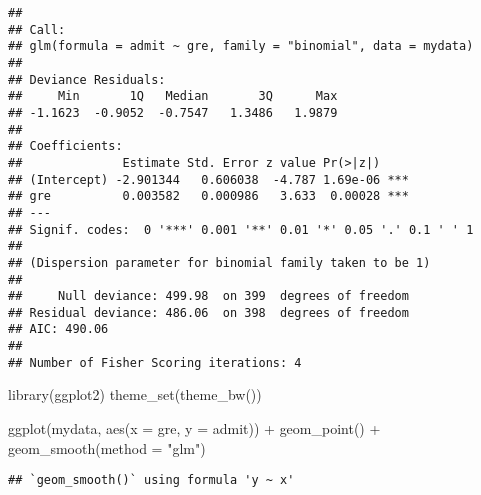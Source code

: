 \documentclass[
]{book}
\newenvironment{Shaded}{\begin{snugshade}}{\end{snugshade}}
\newcommand{\AttributeTok}[1]{\textcolor[rgb]{0.77,0.63,0.00}{#1}}
\newcommand{\FunctionTok}[1]{\textcolor[rgb]{0.00,0.00,0.00}{#1}}
\newcommand{\NormalTok}[1]{#1}
\newcommand{\OtherTok}[1]{\textcolor[rgb]{0.56,0.35,0.01}{#1}}
\newcommand{\SpecialCharTok}[1]{\textcolor[rgb]{0.00,0.00,0.00}{#1}}
\newcommand{\StringTok}[1]{\textcolor[rgb]{0.31,0.60,0.02}{#1}}
\begin{document}
\begin{Shaded}
\end{Shaded}

\begin{verbatim}
## 
## Call:
## glm(formula = admit ~ gre, family = "binomial", data = mydata)
## 
## Deviance Residuals: 
##     Min       1Q   Median       3Q      Max  
## -1.1623  -0.9052  -0.7547   1.3486   1.9879  
## 
## Coefficients:
##              Estimate Std. Error z value Pr(>|z|)    
## (Intercept) -2.901344   0.606038  -4.787 1.69e-06 ***
## gre          0.003582   0.000986   3.633  0.00028 ***
## ---
## Signif. codes:  0 '***' 0.001 '**' 0.01 '*' 0.05 '.' 0.1 ' ' 1
## 
## (Dispersion parameter for binomial family taken to be 1)
## 
##     Null deviance: 499.98  on 399  degrees of freedom
## Residual deviance: 486.06  on 398  degrees of freedom
## AIC: 490.06
## 
## Number of Fisher Scoring iterations: 4
\end{verbatim}

\begin{Shaded}
\begin{Highlighting}[]
\FunctionTok{library}\NormalTok{(ggplot2)}
\FunctionTok{theme\_set}\NormalTok{(}\FunctionTok{theme\_bw}\NormalTok{())}

\FunctionTok{ggplot}\NormalTok{(mydata, }\FunctionTok{aes}\NormalTok{(}\AttributeTok{x =}\NormalTok{ gre, }\AttributeTok{y =}\NormalTok{ admit)) }\SpecialCharTok{+}
  \FunctionTok{geom\_point}\NormalTok{() }\SpecialCharTok{+} 
  \FunctionTok{geom\_smooth}\NormalTok{(}\AttributeTok{method =} \StringTok{"glm"}\NormalTok{)}
\end{Highlighting}
\end{Shaded}

\begin{verbatim}
## `geom_smooth()` using formula 'y ~ x'
\end{verbatim}
\end{document}
